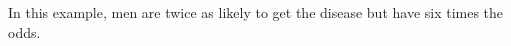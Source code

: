 \documentclass[11pt]{book}\usepackage[]{graphicx}\usepackage[]{color}
\begin{document}
In this example, men are twice as likely to get the disease but have six times the odds.

% 
% 
% 
% 
% 
% 
% 
% 
\end{document}

